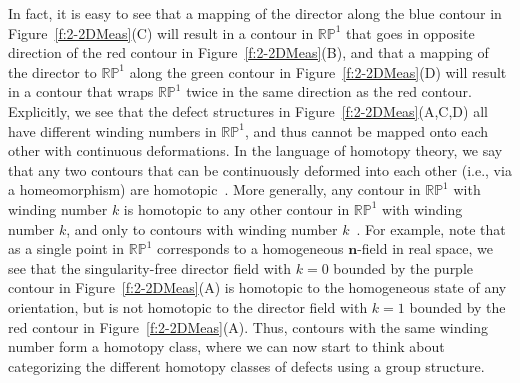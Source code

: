 In fact, it is easy to see that a mapping of the director along the blue contour in Figure~\ref{f:2-2DMeas}(C) will result in a contour in $\mathbb{R}\mathbb{P}^1$ that goes in opposite direction of the red contour in  Figure~\ref{f:2-2DMeas}(B), and that a mapping of the director to $\mathbb{R}\mathbb{P}^1$ along the green contour in Figure~\ref{f:2-2DMeas}(D) will result in a contour that wraps $\mathbb{R}\mathbb{P}^1$ twice in the same direction as the red contour.
Explicitly, we see that the defect structures in Figure~\ref{f:2-2DMeas}(A,C,D) all have different winding numbers in $\mathbb{R}\mathbb{P}^1$, and thus cannot be mapped onto each other with continuous deformations.
In the language of homotopy theory, we say that any two contours that can be continuously deformed into each other (i.e., via a homeomorphism) are homotopic~\cite{RN196}.
More generally, any contour in $\mathbb{R}\mathbb{P}^1$ with winding number $k$ is homotopic to any other contour in $\mathbb{R}\mathbb{P}^1$ with winding number $k$, and only to contours with winding number $k$~\cite{RN196,RN153,RN236}.
For example, note that as a single point in $\mathbb{R}\mathbb{P}^1$ corresponds to a homogeneous $\mathbf{n}$-field in real space, we see that the singularity-free director field with $k=0$ bounded by the purple contour in Figure~\ref{f:2-2DMeas}(A) is homotopic to the homogeneous state of any orientation, but is not homotopic to the director field with $k=1$ bounded by the red contour in Figure~\ref{f:2-2DMeas}(A).
Thus, contours with the same winding number form a homotopy class, where we can now start to think about categorizing the different homotopy classes of defects using a group structure.

